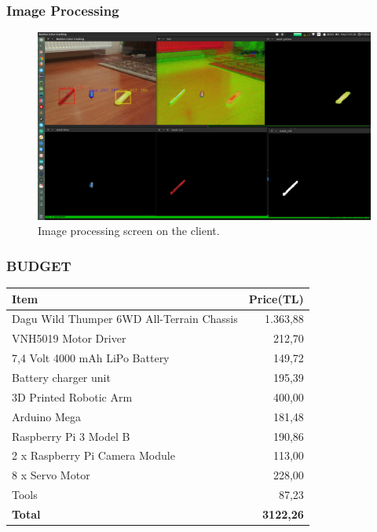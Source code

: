 \documentclass{beamer}
\begin{document}
 \begin{frame}
  \frametitle{Image Processing}
  \begin{figure}[h!]
    \begin{center}
      \includegraphics[scale=0.15]{opencv_python}
      \caption{Image processing screen on the client.}
    \end{center}
  \end{figure}
 \end{frame}
 
 \begin{frame}
  \frametitle{BUDGET}
  \begin{center}
   \begin{tabular}{|l|r|}
   \hline
   \bf Item & \bf Price(TL)\\
   \hline
   Dagu Wild Thumper 6WD All-Terrain Chassis & 1.363,88\\
   VNH5019 Motor Driver & 212,70\\
   7,4 Volt 4000 mAh LiPo Battery & 149,72\\
   Battery charger unit & 195,39\\
   3D Printed Robotic Arm & 400,00\\
   Arduino Mega & 181,48\\
   Raspberry Pi 3 Model B & 190,86\\
   2 x Raspberry Pi Camera Module & 113,00\\
   8 x Servo Motor & 228,00\\
   Tools & 87,23\\
   \hline
   \bf Total & \bf 3122,26\\
   \hline
   \end{tabular}
  \end{center}

 \end{frame}
\end{document}
